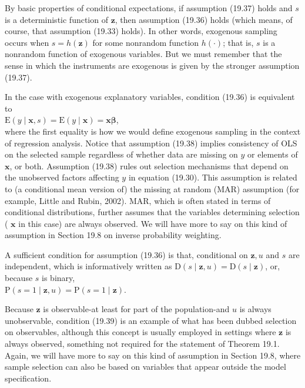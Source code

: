 \documentclass[10pt]{article}
\begin{document}
By basic properties of conditional expectations, if assumption (19.37) holds and $s$ is a deterministic function of $\mathbf{z}$, then assumption (19.36) holds (which means, of course, that assumption (19.33) holds). In other words, exogenous sampling occurs when $s=h(\mathbf{z})$ for some nonrandom function $h(\cdot)$; that is, $s$ is a nonrandom function of exogenous variables. But we must remember that the sense in which the instruments are exogenous is given by the stronger assumption (19.37).

In the case with exogenous explanatory variables, condition (19.36) is equivalent to\\
$\mathrm{E}(y \mid \mathbf{x}, s)=\mathrm{E}(y \mid \mathbf{x})=\mathbf{x} \boldsymbol{\beta}$,\\
where the first equality is how we would define exogenous sampling in the context of regression analysis. Notice that assumption (19.38) implies consistency of OLS on the selected sample regardless of whether data are missing on $y$ or elements of $\mathbf{x}$, or both. Assumption (19.38) rules out selection mechanisms that depend on the unobserved factors affecting $y$ in equation (19.30). This assumption is related to (a conditional mean version of) the missing at random (MAR) assumption (for example, Little and Rubin, 2002). MAR, which is often stated in terms of conditional distributions, further assumes that the variables determining selection ( $\mathbf{x}$ in this case) are always observed. We will have more to say on this kind of assumption in Section 19.8 on inverse probability weighting.

A sufficient condition for assumption (19.36) is that, conditional on $\mathbf{z}, u$ and $s$ are independent, which is informatively written as $\mathrm{D}(s \mid \mathbf{z}, u)=\mathrm{D}(s \mid \mathbf{z})$, or, because $s$ is binary,\\
$\mathrm{P}(s=1 \mid \mathbf{z}, u)=\mathrm{P}(s=1 \mid \mathbf{z})$.

Because $\mathbf{z}$ is observable-at least for part of the population-and $u$ is always unobservable, condition (19.39) is an example of what has been dubbed selection on observables, although this concept is usually employed in settings where $\mathbf{z}$ is always observed, something not required for the statement of Theorem 19.1. Again, we will have more to say on this kind of assumption in Section 19.8, where sample selection can also be based on variables that appear outside the model specification.
\end{document}

